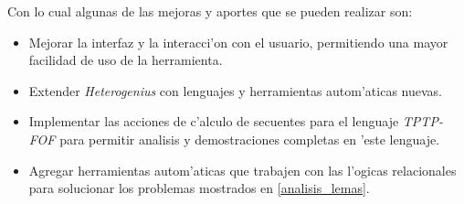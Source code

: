 Con lo cual algunas de las mejoras y aportes que se pueden realizar son:

\begin{itemize}

\item Mejorar la interfaz y la interacci'on con el usuario, permitiendo una mayor facilidad de uso de la herramienta.

\item Extender \textit{Heterogenius} con lenguajes y herramientas autom'aticas nuevas.

\item Implementar las acciones de c'alculo de secuentes para el lenguaje \textit{TPTP-FOF} para permitir analisis y demostraciones completas en 'este lenguaje.

\item Agregar herramientas autom'aticas que trabajen con las l'ogicas relacionales para solucionar los problemas mostrados en \ref{analisis_lemas}.

\end{itemize}




